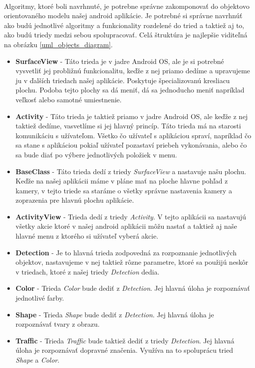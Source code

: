 \documentclass[12pt]{article}
\begin{document}
\paragraph{}
Algoritmy, ktoré boli navrhnuté, je potrebne správne zakomponovať do objektovo orientovaného modelu našej android aplikácie.
Je potrebné si správne navrhnúť ako budú jednotlivé algoritmy a funkcionality rozdelené do tried a taktiež aj to, ako budú triedy medzi sebou spolupracovať.
Celá štruktúra je najlepšie viditeľná na obrázku \ref{uml_objects_diagram}.
\begin{itemize}
  \item \textbf{SurfaceView} - Táto trieda je v jadre Android OS, ale je si potrebné vysvetliť jej probližnú funkcionalitu, keďže z nej priamo dedíme a upravujeme ju v ďalších triedach našej aplikácie.
  Poskytuje špecializovanú kresliacu plochu. Podoba tejto plochy sa dá meniť, dá sa jednoducho meniť napríklad veľkosť alebo samotné umiestnenie. \cite{android_dev}
  \item \textbf{Activity} - Táto trieda je taktiež priamo v jadre Android OS, ale keďže z nej taktiež dedíme, vasvetlíme si jej hlavný princíp.
  Táto trieda má na starosti komunikáciu s užívateľom. Všetko čo užívateľ s aplikáciou spraví, napríklad čo sa stane s aplikáciou pokiaľ užívateľ pozastaví priebeh vykonávania, alebo čo sa bude diať po výbere jednotlivých položiek v menu. \cite{android_dev}
  \item \textbf{BaseClass} - Táto trieda dedí z triedy \emph{SurfaceView} a nastavuje našu plochu. Keďže na našej aplikácii máme v pláne mať na ploche hlavne pohľad z kamery, v tejto triede sa staráme o všetky správne nastavenia kamery a zoprazenia pre hlavnú plochu aplikácie.
  \item \textbf{ActivityView} - Trieda dedí z triedy \emph{Activity}. V tejto aplikácii sa nastavujú všetky akcie ktoré v našej android aplikácii môžu nastať a taktiež aj naše hlavné menu z ktorého si užívateľ vyberá akcie.
  \item \textbf{Detection} - Je to hlavná trieda zodpovedná za rozpoznanie jednotlivých objektov, nastavujeme v nej taktiež rôzne parametre, ktoré sa použijú neskôr v triedach, ktoré z našej triedy \emph{Detection} dedia.
  \item \textbf{Color} - Trieda \emph{Color} bude dediť z \emph{Detection}. Jej hlavná úloha je rozpoznávať jednotlivé farby.
  \item \textbf{Shape} - Trieda \emph{Shape} bude dediť z \emph{Detection}. Jej hlavná úloha je rozpoznávať tvary z obrazu.
  \item \textbf{Traffic} - Trieda \emph{Traffic} bude taktiež dediť z triedy \emph{Detection}. Jej hlavná úloha je rozpoznávať dopravné značenia. Využíva na to spoluprácu tried \emph{Shape} a \emph{Color}.
\end{itemize}
\end{document}
